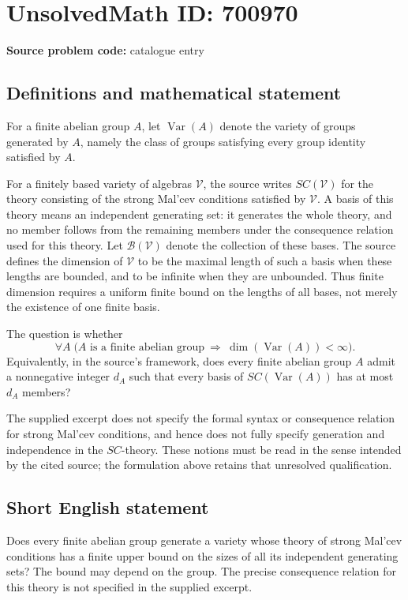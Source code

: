\documentclass[11pt]{article}
\begin{document}
\section*{UnsolvedMath ID: 700970}
\textbf{Source problem code:} catalogue entry
\subsection{Definitions and mathematical statement}
For a finite abelian group \(A\), let \(\operatorname{Var}(A)\) denote the variety of groups generated by \(A\), namely the class of groups satisfying every group identity satisfied by \(A\).

For a finitely based variety of algebras \(\mathcal V\), the source writes \(SC(\mathcal V)\) for the theory consisting of the strong Mal'cev conditions satisfied by \(\mathcal V\). A basis of this theory means an independent generating set: it generates the whole theory, and no member follows from the remaining members under the consequence relation used for this theory. Let \(\mathscr B(\mathcal V)\) denote the collection of these bases. The source defines the dimension of \(\mathcal V\) to be the maximal length of such a basis when these lengths are bounded, and to be infinite when they are unbounded. Thus finite dimension requires a uniform finite bound on the lengths of all bases, not merely the existence of one finite basis.

The question is whether
\[
\forall A\;\bigl(A\text{ is a finite abelian group}\ \Longrightarrow\ \dim(\operatorname{Var}(A))<\infty\bigr).
\]
Equivalently, in the source's framework, does every finite abelian group \(A\) admit a nonnegative integer \(d_A\) such that every basis of \(SC(\operatorname{Var}(A))\) has at most \(d_A\) members?

The supplied excerpt does not specify the formal syntax or consequence relation for strong Mal'cev conditions, and hence does not fully specify generation and independence in the \(SC\)-theory. These notions must be read in the sense intended by the cited source; the formulation above retains that unresolved qualification.
\subsection{Short English statement}
Does every finite abelian group generate a variety whose theory of strong Mal'cev conditions has a finite upper bound on the sizes of all its independent generating sets? The bound may depend on the group. The precise consequence relation for this theory is not specified in the supplied excerpt.
\end{document}
